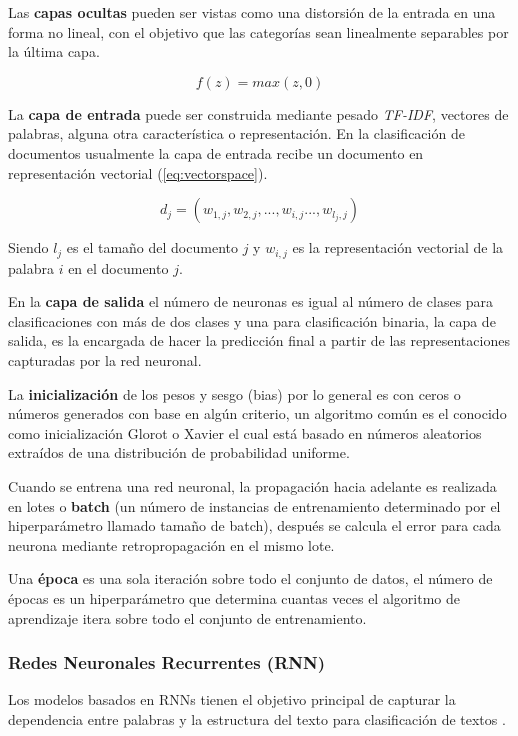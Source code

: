 Las\textbf{ capas ocultas} pueden ser vistas como una distorsión de la entrada en una forma no lineal, con el objetivo que las categorías sean linealmente separables por la última capa.

\begin{equation} \label{eq:RELU}
    f(z)= max(z,0)
\end{equation}

La \textbf{capa de entrada} puede ser construida mediante pesado \textit{TF-IDF}, vectores de palabras, alguna otra característica o representación. En la clasificación de documentos usualmente la capa de entrada recibe un documento en representación vectorial (\ref{eq:vectorspace}).

\begin{equation} \label{eq:vectorspace}
d_{j} = (w_{1,j},w_{2,j},...,w_{i,j}...,w_{l_{j},j})
\end{equation}

Siendo $l_{j}$ es el tamaño del documento $j$ y $w_{i,j}$ es la representación vectorial de la palabra $i$ en el documento $j$.

En la \textbf{capa de salida} el número de neuronas es igual al número de clases para clasificaciones con más de dos clases y una para clasificación binaria, la capa de salida, es la encargada de hacer la predicción final a partir de las representaciones capturadas por la red neuronal.

La \textbf{inicialización} de los pesos y sesgo (bias) por lo general es con ceros o números generados con base en algún criterio, un algoritmo común es el conocido como inicialización Glorot o Xavier \citep{glorot2010understanding} el cual está basado en números aleatorios extraídos de una distribución de probabilidad uniforme.

Cuando se entrena una red neuronal, la propagación hacia adelante es realizada en lotes o \textbf{batch} (un número de instancias de entrenamiento determinado por el hiperparámetro llamado tamaño de batch), después se calcula el error para cada neurona mediante retropropagación en el mismo lote. 

Una \textbf{época} es una sola iteración sobre todo el conjunto de datos, el número de épocas es un hiperparámetro que determina cuantas veces el algoritmo de aprendizaje itera sobre todo el conjunto de entrenamiento.

\subsubsection{Redes Neuronales Recurrentes (RNN)}
Los modelos basados en RNNs tienen el objetivo principal de capturar la dependencia entre palabras y la estructura del texto para clasificación de textos \cite{goodfellow2016deep}.

